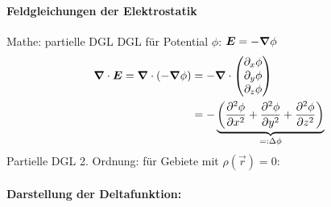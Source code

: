 \paragraph{Feldgleichungen der Elektrostatik}
Mathe: partielle DGL
\noindent
DGL für Potential $\phi$: 
$\bm{E} = - \bm{\nabla} \phi$
\begin{align*}\bm{\nabla} \cdot \bm{E} = \bm{\nabla} \cdot (- \bm{\nabla} \phi) &= - \bm{\nabla} \cdot \begin{pmatrix} 
\partial_x \phi \\
\partial_y \phi \\ 
\partial_z \phi 
\end{pmatrix} \\
&= - \underbrace{\left( \frac{\partial^2 \phi}{\partial x^2} + \frac{\partial^2 \phi}{\partial y^2} + \frac{\partial^2 \phi}{\partial  z^2} \right) }_{=: \Delta \phi}\end{align*}
Partielle DGL 2. Ordnung:
\noindent
für Gebiete mit $\rho (\vec{r}) = 0$:
\begin{center}
	\begin{minipage}{.4\linewidth}
	\end{minipage}
\end{center}

\paragraph{Darstellung der Deltafunktion:}

